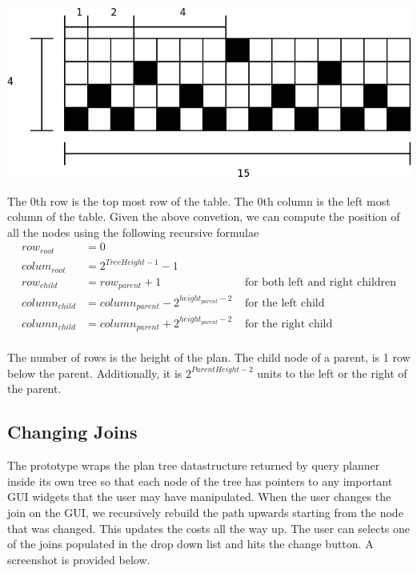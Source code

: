 \documentclass[letterpaper,10pt]{article}
\begin{document}
\includegraphics[scale=0.5]{table-derivation.png}

The 0th row is the top most row of the table. The 0th column is the left most
column of the table. Given the above convetion, we can compute the position of
all the nodes using the following recursive formulae \\
\begin{align*}
	row_{root} & = 0 \\
	colum_{root} & = 2^{TreeHeight-1}-1 \\
	row_{child} & = row_{parent} + 1 & \mbox { for both left and right children}\\
	column_{child} & = column_{parent} - 2^{height_{parent}-2} & \mbox { for the left child} \\
	column_{child} & = column_{parent} + 2^{height_{parent}-2} & \mbox { for the right child} \\
\end{align*}

The number of rows is the height of the plan. The child node of a parent, is 1
row below the parent. Additionally, it is $2^{ParentHeight-2}$ units to the left
or the right of the parent.

\subsection{Changing Joins}
The prototype wraps the plan tree datastructure returned by query planner inside
its own tree so that each node of the tree has pointers to any important GUI
widgets that the user may have manipulated. When the user changes the join on
the GUI, we recursively rebuild the path upwards starting from the node that was
changed. This updates the costs all the way up. The user can selects one of the
joins populated in the drop down list and hits the change button. A screenshot
is provided below.
\end{document}

